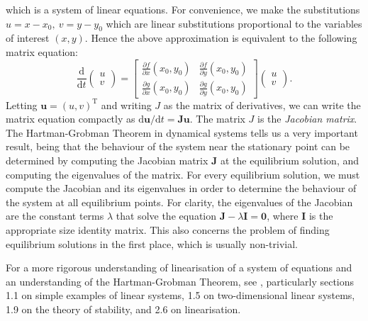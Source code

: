 \documentclass{book}
\begin{document}
which is a system of linear equations.
For convenience, we make the substitutions \(u = x-x_0,~v = y-y_0\) which are linear substitutions proportional to the variables of interest \((x,y)\).
Hence the above approximation is equivalent to the following matrix equation:
\begin{equation}
    \frac{\mathrm{d}}{\mathrm{d}t} \begin{pmatrix}
        u \\
        v
    \end{pmatrix} = \begin{bmatrix}
        \frac{\partial f}{\partial x}(x_0,y_0) & \frac{\partial f}{\partial y}(x_0,y_0) \\
        \frac{\partial g}{\partial x}(x_0,y_0) & \frac{\partial g}{\partial y}(x_0,y_0)
    \end{bmatrix} \begin{pmatrix}
        u \\
        v
    \end{pmatrix}.
\end{equation}
Letting \(\mathbf{u} = (u,v)^\mathrm{T}\) and writing \(J\) as the matrix of derivatives,
we can write the matrix equation compactly as \(\mathrm{d}\mathbf{u}/\mathrm{d}t = \mathbf{J}\mathbf{u}\).
The matrix \(J\) is the \textit{Jacobian matrix}.
The Hartman-Grobman Theorem in dynamical systems tells us a very important result,
being that the behaviour of the system near the stationary point can be determined by computing the Jacobian matrix \(\mathbf{J}\) at the equilibrium solution,
and computing the eigenvalues of the matrix.
For every equilibrium solution, we must compute the Jacobian and its eigenvalues in order to determine the behaviour of the system at all equilibrium points.
For clarity, the eigenvalues of the Jacobian are the constant terms \(\lambda\) that solve the equation \( \mathbf{J} -  \lambda \mathbf{I} = \mathbf{0}\),
where \(\mathbf{I}\) is the appropriate size identity matrix.
This also concerns the problem of finding equilibrium solutions in the first place, which is usually non-trivial.

For a more rigorous understanding of linearisation of a system of equations and an understanding of the Hartman-Grobman Theorem,
see \cite{perko_textbook_1996}, particularly sections
1.1 on simple examples of linear systems,
1.5 on two-dimensional linear systems,
1.9 on the theory of stability,
and 2.6 on linearisation.






\end{document}
